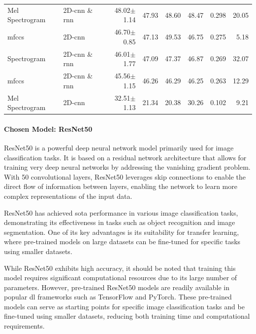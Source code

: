 \begin{table}[H]
{\begin{tabular}{llrrrrrr}
			Mel Spectrogram & 2D-\ac{cnn} \& \ac{rnn} & 48.02$\pm$1.14 & 47.93 & 48.60 & 48.47 & 0.298 & 20.05 \\
			
			\ac{mfccs} &  2D-\ac{cnn} & 46.70$\pm$0.85 & 47.13 & 49.53 & 46.75 & 0.275 & 5.18 \\
			
			Spectrogram & 2D-\ac{cnn} \& \ac{rnn} & 46.01$\pm$1.77 & 47.09 & 47.37 & 46.87 & 0.269 & 32.07 \\
			
			\ac{mfccs} & 2D-\ac{cnn} \& \ac{rnn} & 45.56$\pm$1.15 & 46.26 & 46.29 & 46.25 & 0.263 & 12.29 \\
			
			Mel Spectrogram &  2D-\ac{cnn} & 32.51$\pm$1.13 & 21.34 & 20.38 & 30.26 & 0.102 & 9.21 \\
			
			\bottomrule
		\end{tabular}%
	}
\end{table}

\paragraph{Chosen Model: ResNet50}

ResNet50 is a powerful deep neural network model primarily used for image classification tasks. It is based on a residual network architecture that allows for training very deep neural networks by addressing the vanishing gradient problem. With 50 convolutional layers, ResNet50 leverages skip connections to enable the direct flow of information between layers, enabling the network to learn more complex representations of the input data.

ResNet50 has achieved \ac{sota} performance in various image classification tasks, demonstrating its effectiveness in tasks such as object recognition and image segmentation. One of its key advantages is its suitability for transfer learning, where pre-trained models on large datasets can be fine-tuned for specific tasks using smaller datasets.

While ResNet50 exhibits high accuracy, it should be noted that training this model requires significant computational resources due to its large number of parameters. However, pre-trained ResNet50 models are readily available in popular \ac{dl} frameworks such as TensorFlow and PyTorch. These pre-trained models can serve as starting points for specific image classification tasks and be fine-tuned using smaller datasets, reducing both training time and computational requirements.

